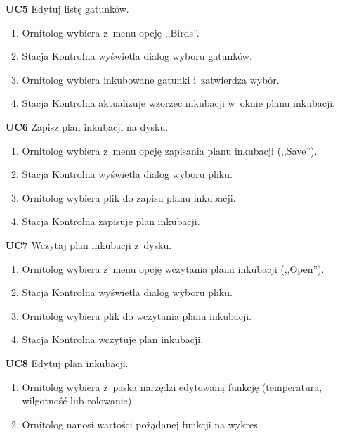 \begin{itemize}
	\item[\textbf{UC5}] Edytuj listę gatunków.
		\begin{enumerate}
			\item Ornitolog wybiera z~menu opcję ,,Birds''.
			\item Stacja Kontrolna wyświetla dialog wyboru gatunków.
			\item Ornitolog wybiera inkubowane gatunki i~zatwierdza wybór.
			\item Stacja Kontrolna aktualizuje wzorzec inkubacji w~oknie planu inkubacji.
		\end{enumerate}

	\item[\textbf{UC6}] Zapisz plan inkubacji na dysku.
		\begin{enumerate}
			\item Ornitolog wybiera z~menu opcję zapisania planu inkubacji (,,Save'').
			\item Stacja Kontrolna wyświetla dialog wyboru pliku.
			\item Ornitolog wybiera plik do zapisu planu inkubacji.
			\item Stacja Kontrolna zapisuje plan inkubacji.
		\end{enumerate}

	\item[\textbf{UC7}] Wczytaj plan inkubacji z~dysku.
		\begin{enumerate}
			\item Ornitolog wybiera z~menu opcję wczytania planu inkubacji (,,Open'').
			\item Stacja Kontrolna wyświetla dialog wyboru pliku.
			\item Ornitolog wybiera plik do wczytania planu inkubacji.
			\item Stacja Kontrolna wczytuje plan inkubacji.
		\end{enumerate}

	\item[\textbf{UC8}] Edytuj plan inkubacji.
		\begin{enumerate}
			\item Ornitolog wybiera z~paska narzędzi edytowaną funkcję (temperatura, wilgotność lub rolowanie).
			\item Ornitolog nanosi wartości pożądanej funkcji na wykres.
		\end{enumerate}


\end{itemize}
